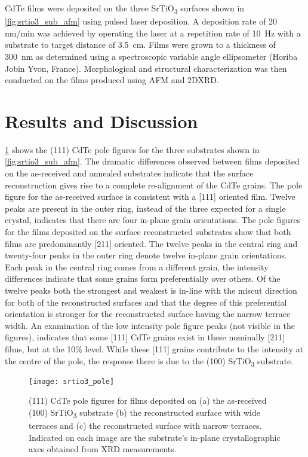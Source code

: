 CdTe films were deposited on the three SrTiO\textsubscript{3} surfaces shown in \cref{fig:srtio3_sub_afm} using pulsed laser deposition.
A deposition rate of 20 nm/min was achieved by operating the laser at a repetition rate of 10~Hz with a substrate to target distance of 3.5~cm.
Films were grown to a thickness of 300~nm as determined using a spectroscopic variable angle ellipsometer (Horiba Jobin Yvon, France).
Morphological and structural characterization was then conducted on the films produced using AFM and 2DXRD\@.
\section{Results and Discussion}
\cref{fig:srtio3_pole} shows the (111) CdTe pole figures for the three substrates shown in \cref{fig:srtio3_sub_afm}.
The dramatic differences observed between films deposited on the as-received and annealed substrates indicate that the surface reconstruction gives rise to a complete re-alignment of the CdTe grains.
The pole figure for the as-received surface is consistent with a [111] oriented film.
Twelve peaks are present in the outer ring, instead of the three expected for a single crystal, indicates that there are four in-plane grain orientations.
The pole figures for the films deposited on the surface reconstructed substrates show that both films are predominantly [211] oriented.
The twelve peaks in the central ring and twenty-four peaks in the outer ring denote twelve in-plane grain orientations.
Each peak in the central ring comes from a different grain, the intensity differences indicate that some grains form preferentially over others.
Of the twelve peaks both the strongest and weakest is in-line with the miscut direction for both of the reconstructed surfaces and that the degree of this preferential orientation is stronger for the reconstructed surface having the narrow terrace width.
An examination of the low intensity pole figure peaks (not visible in the figures), indicates that some [111] CdTe grains exist in these nominally [211] films, but at the 10\% level.
While these [111] grains contribute to
the intensity at the centre of the pole, the response there is due to the (100) SrTiO\textsubscript{3} substrate.
\begin{figure}
 \centering \texttt{[image: srtio3\_pole]}
 \caption[Pole figures of CdTe grown on SrTiO\textsubscript{3}]{\label{fig:srtio3_pole}(111) CdTe pole figures for films deposited on (a) the as-received (100) SrTiO\textsubscript{3} substrate (b) the reconstructed surface with wide terraces and (c) the reconstructed surface with narrow terraces.
  Indicated on each image are the substrate's in-plane crystallographic axes obtained from XRD measurements.}
\end{figure}
